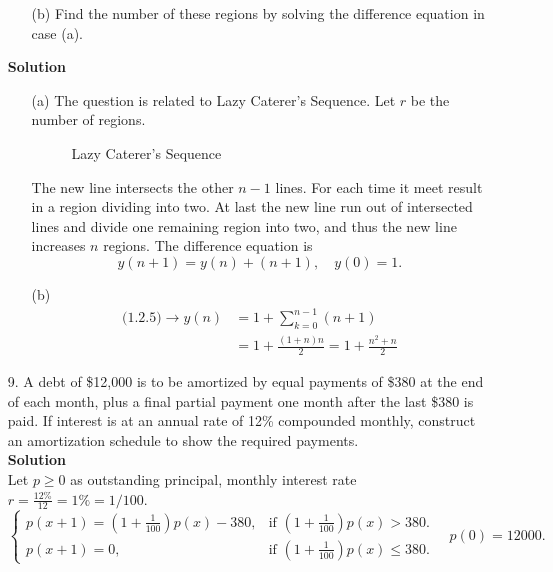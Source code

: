\begin{enumerate}
\begin{itemize}
            \item[(b)] Find the number of these regions by solving the difference equation in case (a).
        \end{itemize}
        \textbf{Solution} 
        \begin{itemize}
            \item[(a)] The question is related to Lazy Caterer's Sequence. Let $r$ be the number of regions. \\
                \begin{figure}[H]
                    \centering
                    \caption{Lazy Caterer's Sequence}
                    \label{fig:lazy-caterers-sequence}
                \end{figure}
                The new line intersects the other $n-1$ lines. For each time it meet result in a region dividing into two. At last the new line run out of intersected lines and divide one remaining region into two, and thus the new line increases $n$ regions. The difference equation is
                $$y(n+1)=y(n)+(n+1),\quad y(0)=1.$$
            \item[(b)] \begin{align*}
                    \text{(1.2.5)}\to y(n) & =1+\sum_{k=0}^{n-1}(n+1) \\
                                     & =1+\frac{(1+n)n}{2}=1+\frac{n^2+n}{2}
                \end{align*}
        \end{itemize}
    \item[9.] A debt of \$12,000 is to be amortized by equal payments of \$380 at the end of each month, plus a final partial payment one month after the last \$380 is paid. If interest is at an annual rate of 12\% compounded monthly, construct an amortization schedule to show the required payments. \\
        \textbf{Solution} \\
        Let $p\geq 0$ as outstanding principal, monthly interest rate $r=\frac{12\%}{12}=1\%=1/100$. \\
        $$
        \begin{cases}
            p(x+1)=\left(1+\frac{1}{100}\right)p(x)-380, & \text{if }\left(1+\frac{1}{100}\right)p(x)>380. \\
            p(x+1)=0, & \text{if }\left(1+\frac{1}{100}\right)p(x)\leq 380.
        \end{cases}
        \quad p(0)=12000.
        $$
        \begin{align*}

\end{align*}
\end{enumerate}
